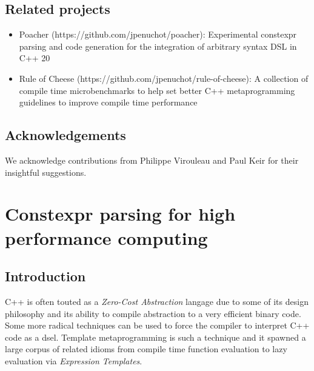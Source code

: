 \documentclass[english,12pt,a4paper]{book}
\providecommand{\cpp}{\textsc{C++}\xspace}
\begin{document}
\section{Related projects} %

\begin{itemize}

\item Poacher (https://github.com/jpenuchot/poacher): Experimental constexpr
      parsing and code generation for the integration of arbitrary syntax DSL in
      \cpp20

\item Rule of Cheese (https://github.com/jpenuchot/rule-of-cheese):
      A collection of compile time microbenchmarks to help set better
      \cpp metaprogramming guidelines to improve compile time performance
\end{itemize}

\section{Acknowledgements}

We acknowledge contributions from Philippe Virouleau and Paul Keir for their
insightful suggestions.

\chapter{
  Constexpr parsing for high performance computing
}

\section{Introduction}

\cpp is often touted as a \textit{Zero-Cost Abstraction} langage due to some of
its design philosophy and its ability to compile abstraction to a very efficient
binary code. Some more radical techniques can be used to force the compiler to
interpret \cpp code as a \acrshort{dsel}. Template metaprogramming is such a technique
and it spawned a large corpus of related idioms from compile time function
evaluation to lazy evaluation via \textit{Expression Templates}.
\end{document}
